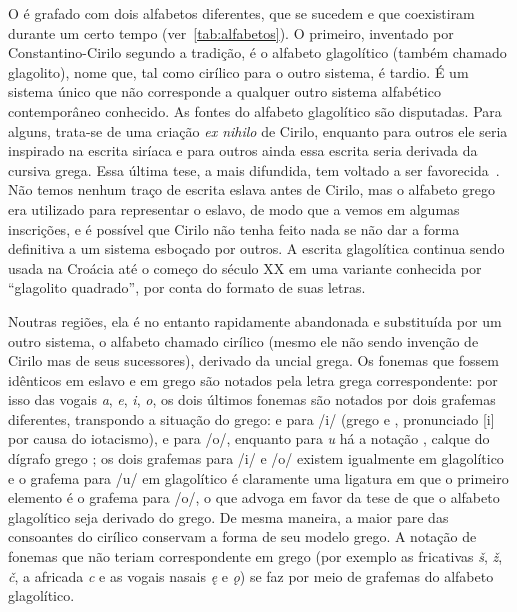 O  é grafado com dois alfabetos diferentes, que se sucedem e que
coexistiram durante um certo tempo (ver~\autoref{tab:alfabetos}).
O primeiro, inventado por Constantino-Cirilo segundo a tradição, é o alfabeto
glagolítico (também chamado glagolito), nome que, tal como cirílico para o outro
sistema, é tardio.
É um sistema único que não corresponde a qualquer outro sistema alfabético
contemporâneo conhecido.
As fontes do alfabeto glagolítico são disputadas.
Para alguns, trata-se de uma criação \emph{ex nihilo} de Cirilo, enquanto para
outros ele seria inspirado na escrita siríaca e para outros ainda essa escrita
seria derivada da cursiva grega.
Essa última tese, a mais difundida, tem voltado a ser favorecida~\cite[para o estado
	da questão, ver][]{Marti2004}.
Não temos nenhum traço de escrita eslava antes de Cirilo, mas o alfabeto grego
era utilizado para representar o eslavo, de modo que a vemos em algumas
inscrições, e é possível que Cirilo não tenha feito nada se não dar a forma
definitiva a um sistema esboçado por outros.
A escrita glagolítica continua sendo usada na Croácia até o começo do século XX
em uma variante conhecida por ``glagolito quadrado'', por conta do formato de
suas letras.

Noutras regiões, ela é no entanto rapidamente abandonada e substituída por um
outro sistema, o alfabeto chamado cirílico (mesmo ele não sendo invenção de
Cirilo mas de seus sucessores), derivado da uncial grega.
Os fonemas que fossem idênticos em eslavo e em grego são notados pela letra
grega correspondente: por isso das vogais \emph{a}, \emph{e}, \emph{i},
\emph{o}, os dois últimos fonemas são notados por dois grafemas diferentes,
transpondo a situação do grego:
 e  para /i/ (grego  e
, pronunciado [i] por causa do iotacismo),  e
 para /o/, enquanto para \emph{u} há a notação
, calque do dígrafo grego ;
os dois grafemas para /i/ e /o/ existem igualmente em glagolítico e o grafema
para /u/ em glagolítico é claramente uma ligatura em que o primeiro elemento é o
grafema para /o/, o que advoga em favor da tese de que o alfabeto glagolítico
seja derivado do grego.
De mesma maneira, a maior pare das consoantes do cirílico conservam a forma de
seu modelo grego.
A notação de fonemas que não teriam correspondente em grego (por exemplo as
fricativas \emph{š}, \emph{ž}, \emph{č}, a africada \emph{c} e as vogais nasais
\emph{ę} e \emph{ǫ}) se faz por meio de grafemas do alfabeto glagolítico.


